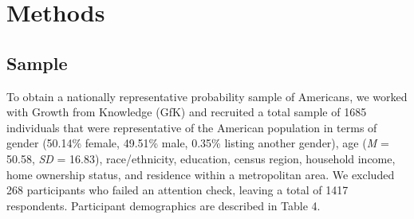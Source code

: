 \documentclass[english,man,mask]{article}
\begin{document}
\hypertarget{methods}{%
\section{Methods}\label{methods}}

\hypertarget{sample}{%
\subsection{Sample}\label{sample}}

To obtain a nationally representative probability sample of Americans, we worked with Growth from Knowledge (GfK) and recruited a total sample of 1685 individuals that were representative of the American population in terms of gender (50.14\% female, 49.51\% male, 0.35\% listing another gender), age (\emph{M} = 50.58, \emph{SD} = 16.83), race/ethnicity, education, census region, household income, home ownership status, and residence within a metropolitan area. We excluded 268 participants who failed an attention check, leaving a total of 1417 respondents. Participant demographics are described in Table 4.
\end{document}
